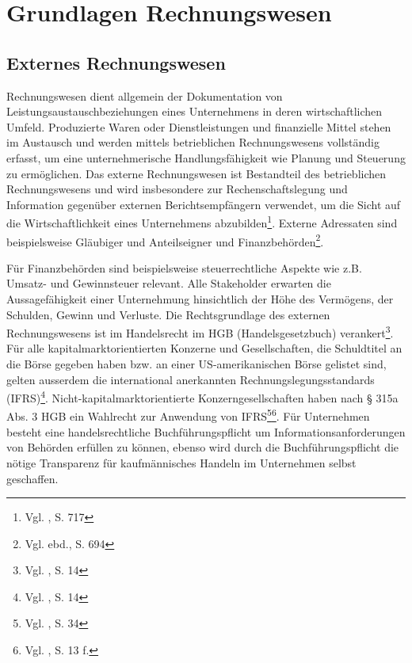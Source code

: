 \section{Grundlagen Rechnungswesen}

\subsection{Externes Rechnungswesen}
\label{ssec:externesRechnungswesen}
Rechnungswesen dient allgemein der Dokumentation von Leistungsaustauschbeziehungen eines Unternehmens in deren wirtschaftlichen Umfeld. Produzierte Waren oder Dienstleistungen und finanzielle Mittel stehen im Austausch und werden mittels betrieblichen Rechnungswesens vollständig erfasst, um eine unternehmerische Handlungsfähigkeit wie Planung und Steuerung zu ermöglichen. Das externe Rechnungswesen ist Bestandteil des betrieblichen Rechnungswesens und wird insbesondere zur Rechenschaftslegung und Information gegenüber externen Berichtsempfängern verwendet, um die Sicht auf die Wirtschaftlichkeit eines Unternehmens abzubilden\footnote{Vgl. \cite{Wohe2000}, S. 717}. Externe Adressaten sind beispielsweise Gläubiger und Anteilseigner und Finanzbehörden\footnote{Vgl. ebd., S. 694}.

Für Finanzbehörden sind beispielsweise steuerrechtliche Aspekte wie z.B. Umsatz- und Gewinnsteuer relevant. Alle Stakeholder erwarten die Aussagefähigkeit einer Unternehmung hinsichtlich der Höhe des Vermögens, der Schulden, Gewinn und Verluste. 
Die Rechtsgrundlage des externen Rechnungswesens ist im Handelsrecht im  HGB (Handelsgesetzbuch) verankert\footnote{Vgl. \cite{Woltje2008}, S. 14}. Für alle kapitalmarktorientierten Konzerne und Gesellschaften, die Schuldtitel an die Börse gegeben haben bzw. an einer US-amerikanischen Börse gelistet sind, gelten ausserdem die international anerkannten Rechnungslegungsstandards (IFRS)\footnote{Vgl. \cite{Klein2010}, S. 14}. Nicht-kapitalmarktorientierte Konzerngesellschaften haben nach § 315a Abs. 3 HGB ein Wahlrecht zur Anwendung von IFRS\footnote{Vgl. \cite{Funk2008}, S. 34}\footnote{Vgl. \cite{Oehler2005}, S. 13 f.}.
Für Unternehmen besteht eine handelsrechtliche Buchführungspflicht um Informationsanforderungen von Behörden erfüllen zu können, ebenso wird durch die Buchführungspflicht die nötige Transparenz für kaufmännisches Handeln im Unternehmen selbst geschaffen.

